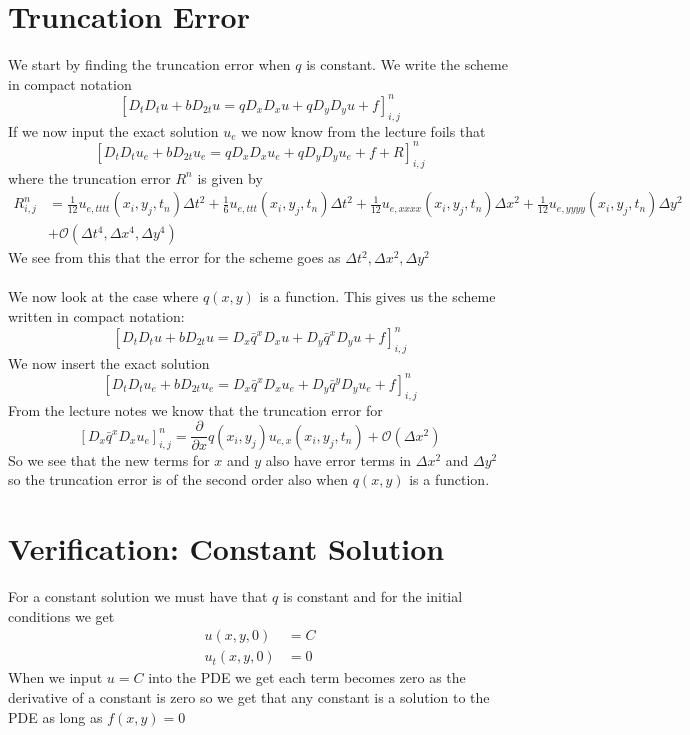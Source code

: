 \documentclass[12pt, norsk, a4paper]{article}
\begin{document}
\section*{Truncation Error}
We start by finding the truncation error when $q$ is constant.
We write the scheme in compact notation
\[\left[D_tD_tu + b D_{2t}u = qD_xD_xu + qD_yD_yu + f\right]_{i,j}^n\]
If we now input the exact solution $u_e$ we now know from the lecture foils that 
\[\left[D_tD_tu_e + bD_{2t}u_e = qD_xD_xu_e+qD_yD_yu_e + f + R\right]_{i,j}^n\]
where the truncation error $R^n$ is given by
\begin{align*}
R_{i,j}^n &= \frac{1}{12}u_{e,tttt}(x_i,y_j,t_n) \Delta t^2 +
\frac{1}{6}u_{e,ttt}(x_i,y_j,t_n)\Delta t^2 +
\frac{1}{12}u_{e,xxxx}(x_i,y_j,t_n)\Delta x^2 +
\frac{1}{12}u_{e,yyyy}(x_i,y_j,t_n)\Delta y^2 \\ 
& + \mathcal{O}(\Delta t^4, \Delta x^4, \Delta y^4)
\end{align*}
We see from this that the error for the scheme goes as $\Delta t^2, \Delta x^2,
   \Delta y^2$ \\ \\
We now look at the case where $q(x,y)$ is a function.
This gives us the scheme written in compact notation:
\[\left[D_tD_tu + b D_{2t}u = D_x\bar{q}^{x}D_xu + D_y\bar{q}^xD_yu + f\right]_{i,j}^n\]
We now insert the exact solution
\[\left[D_tD_tu_e + b D_{2t}u_e = D_x\bar{q}^{x}D_xu_e + D_y\bar{q}^yD_yu_e + f\right]_{i,j}^n\]
From the lecture notes we know that the truncation error for
\[\left[D_x\bar{q}^xD_xu_e\right]_{i,j}^n = \frac{\partial}{\partial x}
q(x_i,y_j)u_{e,x}(x_i,y_j,t_n) + \mathcal{O}(\Delta x^2)\]
So we see that the new terms for $x$ and $y$ also have error terms  in $\Delta
x^2$ and $\Delta y^2$ so the truncation error is of the second order also when
$q(x,y)$ is a function.
\section*{Verification: Constant Solution}
For a constant solution we must have that $q$ is constant and for the initial conditions we get
\begin{align*}
u(x,y,0) &= C \\
u_t(x,y,0) &= 0
\end{align*}
When we input $u=C$ into the PDE we get each term becomes zero as the derivative of a constant is zero so we get that any constant is a solution to the PDE as long as $f(x,y)=0$
\end{document}
